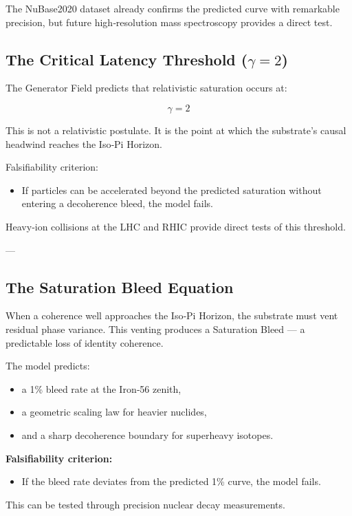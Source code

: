 \documentclass[reprint,amsmath,amssymb,aps,prl,floatfix]{revtex4-2}
\begin{document}
\begin{itemize}
The NuBase2020 dataset already confirms the predicted curve with remarkable precision, but future high‑resolution mass spectroscopy provides a direct test.

\subsection{The Critical Latency Threshold (\(\gamma = 2\))}

The Generator Field predicts that relativistic saturation occurs at:

\[
\gamma = 2
\]

This is not a relativistic postulate.  
It is the point at which the substrate’s causal headwind reaches the Iso‑Pi Horizon.

Falsifiability criterion:
\begin{itemize}
\item If particles can be accelerated beyond the predicted saturation without entering a decoherence bleed, the model fails.
\end{itemize}

Heavy‑ion collisions at the LHC and RHIC provide direct tests of this threshold.

---

\subsection{The Saturation Bleed Equation}

When a coherence well approaches the Iso‑Pi Horizon, the substrate must vent residual phase variance. This venting produces a Saturation Bleed — a predictable loss of identity coherence.
\medskip

The model predicts:
\begin{itemize}
\item a 1\% bleed rate at the Iron‑56 zenith,  
\item a geometric scaling law for heavier nuclides,  
\item and a sharp decoherence boundary for superheavy isotopes.
\end{itemize}
\medskip

\textbf{Falsifiability criterion:}
\begin{itemize}
\item If the bleed rate deviates from the predicted 1\% curve, the model fails.
\end{itemize}

This can be tested through precision nuclear decay measurements.


\end{itemize}
\end{document}
